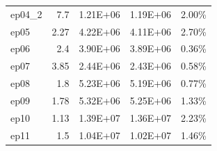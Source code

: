 \documentclass[3p,times,number,review]{elsarticle}
\begin{document}
\begin{table}[]
\begin{tabular}{lrrrr}
		ep04\_2          & 7.7                                & 1.21E+06                                                                                   & 1.19E+06                                                                                             & 2.00\%                             \\
		ep05             & 2.27                               & 4.22E+06                                                                                   & 4.11E+06                                                                                             & 2.70\%                             \\
		ep06             & 2.4                                & 3.90E+06                                                                                   & 3.89E+06                                                                                             & 0.36\%                             \\
		ep07             & 3.85                               & 2.44E+06                                                                                   & 2.43E+06                                                                                             & 0.58\%                             \\
		ep08             & 1.8                                & 5.23E+06                                                                                   & 5.19E+06                                                                                             & 0.77\%                             \\
		ep09             & 1.78                               & 5.32E+06                                                                                   & 5.25E+06                                                                                             & 1.33\%                             \\
		ep10             & 1.13                               & 1.39E+07                                                                                   & 1.36E+07                                                                                             & 2.23\%                             \\
		ep11             & 1.5                                & 1.04E+07                                                                                   & 1.02E+07                                                                                             & 1.46\%                             \\

\end{tabular}
\end{table}
\end{document}
